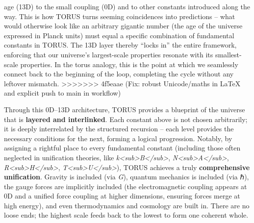 \documentclass[]{article}
\begin{document}
age (13D) to the small coupling (0D) and to other constants introduced
along the way. This is how TORUS turns seeming coincidences into
predictions -- what would otherwise look like an arbitrary gigantic
number (the age of the universe expressed in Planck units) must equal a
specific combination of fundamental constants in TORUS. The 13D layer
thereby ``locks in'' the entire framework, enforcing that our universe's
largest-scale properties resonate with its smallest-scale properties. In
the torus analogy, this is the point at which we seamlessly connect back
to the beginning of the loop, completing the cycle without any leftover
mismatch.
>>>>>>> 4f5eaae (Fix: robust Unicode/maths in LaTeX and explicit push to main in workflow)

Through this 0D--13D architecture, TORUS provides a blueprint of the
universe that is \textbf{layered and interlinked}. Each constant above
is not chosen arbitrarily; it is deeply interrelated by the structured
recursion -- each level provides the necessary conditions for the next,
forming a logical progression. Notably, by assigning a rightful place to
every fundamental constant (including those often neglected in
unification theories, like
\emph{k\textless{}sub\textgreater{}B\textless{}/sub\textgreater{}},
\emph{N\textless{}sub\textgreater{}A\textless{}/sub\textgreater{}},
\emph{R\textless{}sub\textgreater{}H\textless{}/sub\textgreater{}},
\emph{T\textless{}sub\textgreater{}U\textless{}/sub\textgreater{}}),
TORUS achieves a truly \textbf{comprehensive unification}. Gravity is
included (via \emph{G}), quantum mechanics is included (via ℏ), the
gauge forces are implicitly included (the electromagnetic coupling
appears at 0D and a unified force coupling at higher dimensions,
ensuring forces merge at high energy), and even thermodynamics and
cosmology are built in. There are no loose ends; the highest scale feeds
back to the lowest to form one coherent whole.
\end{document}
